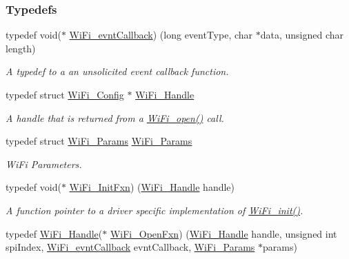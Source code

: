 \subsubsection*{Typedefs}
\begin{DoxyCompactItemize}
\item 
typedef void($\ast$ \hyperlink{_wi_fi_8h_a6441e73863c7f533a09c508e44734e09}{Wi\+Fi\+\_\+evnt\+Callback}) (long event\+Type, char $\ast$data, unsigned char length)
\begin{DoxyCompactList}\small\item\em A typedef to a an unsolicited event callback function. \end{DoxyCompactList}\item 
typedef struct \hyperlink{struct_wi_fi___config}{Wi\+Fi\+\_\+\+Config} $\ast$ \hyperlink{_wi_fi_8h_a2969512dbfbf2a383ac8c1a9cf01a95c}{Wi\+Fi\+\_\+\+Handle}
\begin{DoxyCompactList}\small\item\em A handle that is returned from a \hyperlink{_wi_fi_8h_a74bfb46543ca040aabea15dc58f16e92}{Wi\+Fi\+\_\+open()} call. \end{DoxyCompactList}\item 
typedef struct \hyperlink{struct_wi_fi___params}{Wi\+Fi\+\_\+\+Params} \hyperlink{_wi_fi_8h_aa46f9e8e6cf93cd1eb18ae5af57ce635}{Wi\+Fi\+\_\+\+Params}
\begin{DoxyCompactList}\small\item\em Wi\+Fi Parameters. \end{DoxyCompactList}\item 
typedef void($\ast$ \hyperlink{_wi_fi_8h_ac7aed5d39515b94dc5b850b366c1c493}{Wi\+Fi\+\_\+\+Init\+Fxn}) (\hyperlink{_wi_fi_8h_a2969512dbfbf2a383ac8c1a9cf01a95c}{Wi\+Fi\+\_\+\+Handle} handle)
\begin{DoxyCompactList}\small\item\em A function pointer to a driver specific implementation of \hyperlink{_wi_fi_8h_a306a67ecbf66c31b31ee62a7170c563c}{Wi\+Fi\+\_\+init()}. \end{DoxyCompactList}\item 
typedef \hyperlink{_wi_fi_8h_a2969512dbfbf2a383ac8c1a9cf01a95c}{Wi\+Fi\+\_\+\+Handle}($\ast$ \hyperlink{_wi_fi_8h_a8f482785892cfecbe0799e844c2fb389}{Wi\+Fi\+\_\+\+Open\+Fxn}) (\hyperlink{_wi_fi_8h_a2969512dbfbf2a383ac8c1a9cf01a95c}{Wi\+Fi\+\_\+\+Handle} handle, unsigned int spi\+Index, \hyperlink{_wi_fi_8h_a6441e73863c7f533a09c508e44734e09}{Wi\+Fi\+\_\+evnt\+Callback} evnt\+Callback, \hyperlink{struct_wi_fi___params}{Wi\+Fi\+\_\+\+Params} $\ast$params)

\end{DoxyCompactItemize}

